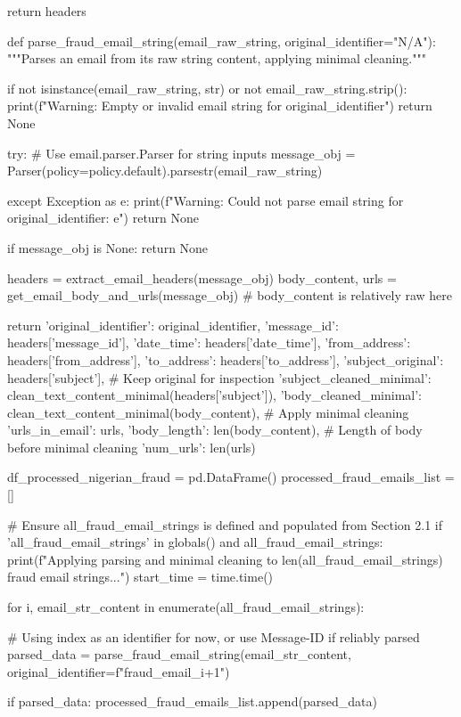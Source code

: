\begin{ffcode}
return headers

def parse_fraud_email_string(email_raw_string, original_identifier="N/A"):
"""Parses an email from its raw string content, applying minimal cleaning."""

if not isinstance(email_raw_string, str) or not email_raw_string.strip():
    print(f"Warning: Empty or invalid email string for {original_identifier}")
    return None

try:
    # Use email.parser.Parser for string inputs
    message_obj = Parser(policy=policy.default).parsestr(email_raw_string)

except Exception as e:
    print(f"Warning: Could not parse email string for {original_identifier}: {e}")
    return None

if message_obj is None:
    return None

headers = extract_email_headers(message_obj)
body_content, urls = get_email_body_and_urls(message_obj) # body_content is relatively raw here

return {
    'original_identifier': original_identifier,
    'message_id': headers['message_id'],
    'date_time': headers['date_time'],
    'from_address': headers['from_address'],
    'to_address': headers['to_address'],
    'subject_original': headers['subject'], # Keep original for inspection
    'subject_cleaned_minimal': clean_text_content_minimal(headers['subject']),
    'body_cleaned_minimal': clean_text_content_minimal(body_content), # Apply minimal cleaning
    'urls_in_email': urls,
    'body_length': len(body_content), # Length of body before minimal cleaning
    'num_urls': len(urls)
}

df_processed_nigerian_fraud = pd.DataFrame()
processed_fraud_emails_list = []

# Ensure all_fraud_email_strings is defined and populated from Section 2.1
if 'all_fraud_email_strings' in globals() and all_fraud_email_strings:
    print(f"Applying parsing and minimal cleaning to {len(all_fraud_email_strings)} fraud email strings...")
    start_time = time.time()

    for i, email_str_content in enumerate(all_fraud_email_strings):

        # Using index as an identifier for now, or use Message-ID if reliably parsed
        parsed_data = parse_fraud_email_string(email_str_content, original_identifier=f"fraud_email_{i+1}")

        if parsed_data:
            processed_fraud_emails_list.append(parsed_data)


\end{ffcode}
